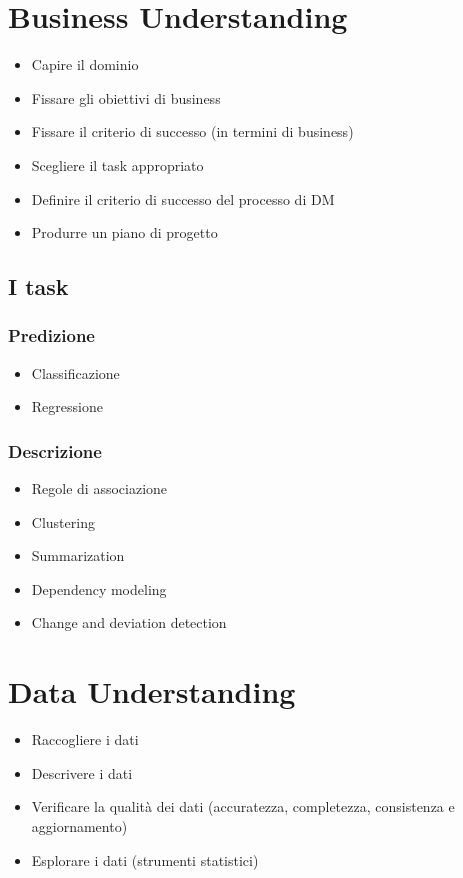 \documentclass[11pt,onecolumn,a4paper,oneside]{book}
\begin{document}
	\section{Business Understanding}
		\begin{itemize}
			\item Capire il dominio
			\item Fissare gli obiettivi di business
			\item Fissare il criterio di successo (in termini di business)
			\item Scegliere il task appropriato
			\item Definire il criterio di successo del processo di DM
			\item Produrre un piano di progetto
		\end{itemize}

		\subsection{I task}
			\subsubsection{Predizione}
\begin{itemize}				
\item Classificazione
\item Regressione
\end{itemize}
			\subsubsection{Descrizione}
\begin{itemize}
\item Regole di associazione
\item Clustering
\item Summarization
\item Dependency modeling
\item Change and deviation detection
\end{itemize}


	\section{Data Understanding}
	
		\begin{itemize}
			\item Raccogliere i dati		
			\item Descrivere i dati
			\item Verificare la qualità dei dati (accuratezza, completezza, consistenza e aggiornamento)
			\item Esplorare i dati (strumenti statistici)
		\end{itemize}
		
\end{document}
